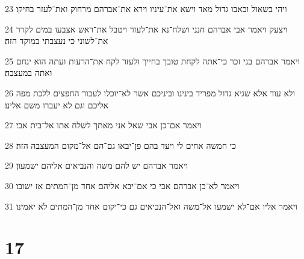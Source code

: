 \par 23 ויהי בשאול וכאבו גדול מאד וישא את־עיניו וירא את־אברהם מרחוק ואת־לעזר בחיקו׃
\par 24 ויצעק ויאמר אבי אברהם חנני ושלח־נא את־לעזר ויטבל את־ראש אצבעו במים לקרר את־לשוני כי נעצבתי במוקד הזה׃
\par 25 ויאמר אברהם בני זכר כי־אתה לקחת טובך בחייך ולעזר לקח את־הרעות ועתה הוא ינחם ואתה במעצבה׃
\par 26 ולא עוד אלא שגיא גדול מפריד בינינו וביניכם אשר לא־יוכלו לעבור החפצים ללכת מפה אליכם וגם לא יעברו משם אלינו׃
\par 27 ויאמר אם־כן אבי שאל אני מאתך לשלח אתו אל־בית אבי׃
\par 28 כי חמשה אחים לי ויעד בהם פן־יבאו גם־הם אל־מקום המעצבה הזה׃
\par 29 ויאמר אברהם יש להם משה והנביאים אליהם ישמעון׃
\par 30 ויאמר לא־כן אברהם אבי כי אם־יבא אליהם אחד מן־המתים אז ישובו׃
\par 31 ויאמר אליו אם־לא ישמעו אל־משה ואל־הנביאים גם כי־יקום אחד מן־המתים לא יאמינו׃

\chapter{17}

